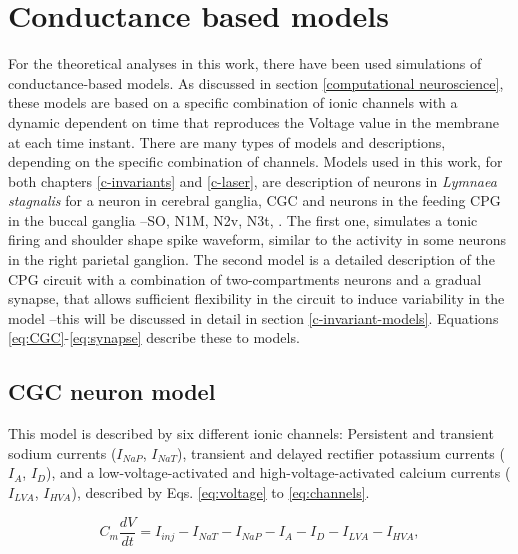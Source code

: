 \section{Conductance based models}
For the theoretical analyses in this work, there have been used simulations of conductance-based models. As discussed in section \ref{computational neuroscience}, these models are based on a specific combination of ionic channels with a dynamic dependent on time that reproduces the Voltage value in the membrane at each time instant. There are many types of models and descriptions, depending on the specific combination of channels. Models used in this work, for both chapters \ref{c-invariants} and \ref{c-laser}, are description of neurons in \textit{Lymnaea stagnalis} for a neuron in cerebral ganglia, CGC \parencite{vavoulis_balanced_2010} and neurons in the feeding CPG in the buccal ganglia --SO, N1M, N2v, N3t, \parencite{vavoulis_computational_2007}. The first one, simulates a tonic firing and shoulder shape spike waveform, similar to the activity in some neurons in the right parietal ganglion. The second model is a detailed description of the CPG circuit with a combination of two-compartments neurons and a gradual synapse, that allows sufficient flexibility in the circuit to induce variability in the model --this will be discussed in detail in section \ref{c-invariant-models}. Equations \ref{eq:CGC}-\ref{eq:synapse} describe these to models. 

\subsection{CGC neuron model}
 This model is described by six different ionic channels: Persistent and transient sodium currents ($I_{NaP}$, $I_{NaT}$), transient and delayed rectifier potassium currents ($I_A$, $I_D$), and a low-voltage-activated and high-voltage-activated calcium currents ($I_{LVA}$, $I_{HVA}$), described by Eqs. \ref{eq:voltage} to \ref{eq:channels}. 
 
  \begin{equation}
 	C_m\frac{dV}{dt} = I_{inj} - I_{NaT} - I_{NaP} - I_{A} - I_{D} - I_{LVA} - I_{HVA},
 	\label{eq:voltage}
 \end{equation}
 
